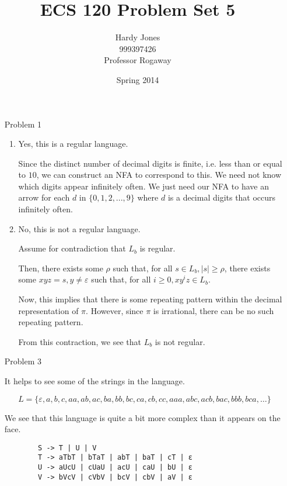 \documentclass[12pt,letterpaper]{article}
\title{ECS 120 Problem Set 5\vspace{-2ex}}
\author{Hardy Jones\\
        999397426\\
        Professor Rogaway\vspace{-2ex}}
\date{Spring 2014}
\begin{document}
  \maketitle

  \begin{enumerate}
    \item[Problem 1]
      \begin{enumerate}
        \item
          Yes, this is a regular language.

          Since the distinct number of decimal digits is finite, i.e. less than or equal to $10$, we can construct an NFA to correspond to this.
          We need not know which digits appear infinitely often.
          We just need our NFA to have an arrow for each $d$ in $\{0,1,2,...,9\}$ where $d$ is a decimal digits that occurs infinitely often.

        \item
          No, this is not a regular language.

          Assume for contradiction that $L_b$ is regular.

          Then, there exists some $\rho$ such that,
          for all $s \in L_b, |s| \ge \rho$,
          there exists some $xyz = s, y \ne \varepsilon$ such that,
          for all $i \ge 0, xy^iz \in L_b$.

          Now, this implies that there is some repeating pattern within the decimal representation of $\pi$.
          However, since $\pi$ is irrational, there can be no such repeating pattern.

          From this contraction, we see that $L_b$ is not regular.
      \end{enumerate}

    \item[Problem 3]

      It helps to see some of the strings in the language.

      \[L = \{\varepsilon, a, b, c, aa, ab, ac, ba, bb, bc, ca, cb, cc, aaa, abc, acb, bac, bbb, bca, \dots\}\]

      We see that this language is quite a bit more complex than it appears on the face.

      \begin{lstlisting}
        S -> T | U | V
        T -> aTbT | bTaT | abT | baT | cT | ε
        U -> aUcU | cUaU | acU | caU | bU | ε
        V -> bVcV | cVbV | bcV | cbV | aV | ε
      \end{lstlisting}


\end{enumerate}
\end{document}
